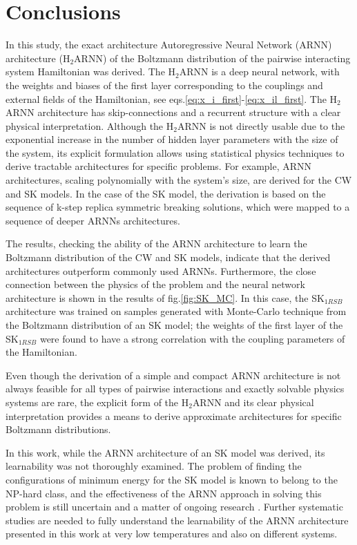 \documentclass[aps,physrev,10pt,floatfix,reprint]{revtex4-2}
\begin{document}
\section{Conclusions}
In this study, the exact architecture  Autoregressive Neural Network (ARNN) architecture (H$_2$ARNN) of the Boltzmann distribution of the pairwise interacting system Hamiltonian was derived. The H$_2$ARNN is a deep neural network, with the weights and biases of the first layer corresponding to the couplings and external fields of the Hamiltonian, see eqs.\ref{eq:x_i_first}-\ref{eq:x_il_first}. The  H$_2$ARNN architecture has skip-connections and a recurrent structure with a clear physical interpretation. Although the H$_2$ARNN is not directly usable due to the exponential increase in the number of hidden layer parameters with the size of the system, its explicit formulation allows using statistical physics techniques to derive tractable architectures for specific problems. For example, ARNN architectures, scaling polynomially with the system's size, are derived for the CW and SK models. In the case of the SK model, the derivation is based on the sequence of k-step replica symmetric breaking solutions, which were mapped to a sequence of deeper ARNNs architectures.

The results, checking the ability of the ARNN architecture to learn the Boltzmann distribution of the CW and SK models, indicate that the derived architectures outperform commonly used ARNNs. Furthermore, the close connection between the physics of the problem and the neural network architecture is shown in the results of fig.\ref{fig:SK_MC}. In this case, the  SK$_{1RSB}$ architecture was trained on samples generated with Monte-Carlo technique from the Boltzmann distribution of an SK model; the weights of the first layer of the SK$_{1RSB}$ were found to have a strong correlation with the coupling parameters of the Hamiltonian.

Even though the derivation of a simple and compact ARNN architecture is not always feasible for all types of pairwise interactions and exactly solvable physics systems are rare, the explicit form of the H$_2$ARNN and its clear physical interpretation provides a means to derive approximate architectures for specific Boltzmann distributions. 

In this work, while the ARNN architecture of an SK model was derived, its learnability was not thoroughly examined. The problem of finding the configurations of minimum energy for the SK model is known to belong to the NP-hard class, and the effectiveness of the ARNN approach in solving this problem is still uncertain and a matter of ongoing research \cite{https://doi.org/10.48550/arxiv.2210.11145, 10.1038/s42256-021-00401-3, condmat7020038}. Further systematic studies are needed to fully understand the learnability of the ARNN architecture presented in this work at very low temperatures and also on different systems.
\end{document}
